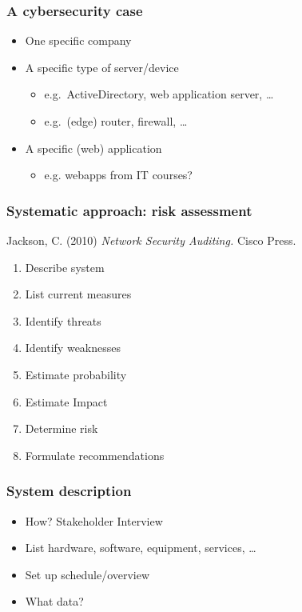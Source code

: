 \documentclass[aspectratio=169]{beamer}
\begin{document}
\begin{frame}
    \frametitle{A cybersecurity case}
    
   \begin{itemize}
       \item One specific company
       \item A specific type of server/device
       \begin{itemize}
           \item e.g.\ ActiveDirectory, web application server, \ldots
           \item e.g.\ (edge) router, firewall, \ldots
       \end{itemize}
       \item A specific (web) application
       \begin{itemize}
           \item e.g. webapps from IT courses?
       \end{itemize}
   \end{itemize}
    
\end{frame}

\begin{frame}
    \frametitle{Systematic approach: risk assessment}
    
    Jackson, C. (2010) \textit{Network Security Auditing.} Cisco Press.
    
    \begin{enumerate}
       \item Describe system
       \item List current measures
       \item Identify threats
       \item Identify weaknesses
       \item Estimate probability
       \item Estimate Impact
       \item Determine risk
       \item Formulate recommendations
    \end{enumerate}
    
\end{frame}

\begin{frame}
    \frametitle{System description}
    
    \begin{itemize}
       \item How? Stakeholder Interview
       \item List hardware, software, equipment, services, \ldots
       \item Set up schedule/overview
       \item What data?
    \end{itemize}
    
\end{frame}
\end{document}
